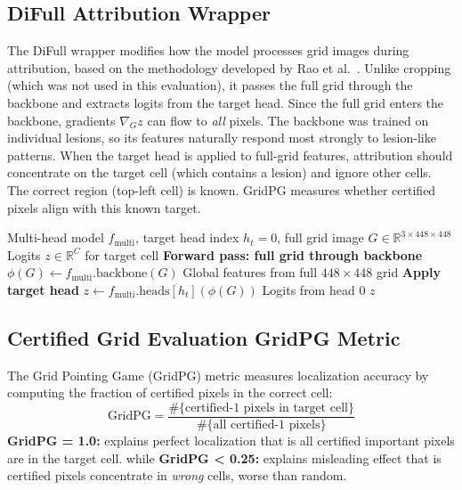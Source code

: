 \documentclass[11pt]{article}
\begin{document}
\subsection{DiFull Attribution Wrapper}

The DiFull wrapper modifies how the model processes grid images during attribution, based on the methodology developed by Rao et al.~\citep{rao2022understanding}. Unlike cropping (which was not used in this evaluation), it passes the full grid through the backbone and extracts logits from the target head. Since the full grid enters the backbone, gradients $\nabla_G z$ can flow to \emph{all} pixels. The backbone was trained on individual lesions, so its features naturally respond most strongly to lesion-like patterns. When the target head is applied to full-grid features, attribution should concentrate on the target cell (which contains a lesion) and ignore other cells.
The correct region (top-left cell) is known. GridPG measures whether certified pixels align with this known target.



\begin{algorithm}[H]
\caption{DiFull Attribution Wrapper}
\label{alg:difull_wrapper}
\begin{algorithmic}[1]
\REQUIRE Multi-head model $f_{\text{multi}}$, target head index $h_t=0$, full grid image $G \in \mathbb{R}^{3 \times 448 \times 448}$
\ENSURE Logits $z \in \mathbb{R}^C$ for target cell
\STATE \textbf{ Forward pass: full grid through backbone}
\STATE $\phi(G) \leftarrow f_{\text{multi}}.\text{backbone}(G)$ \quad  Global features from full $448 \times 448$ grid
\STATE \textbf{ Apply target head}
\STATE $z \leftarrow f_{\text{multi}}.\text{heads}[h_t](\phi(G))$ \quad  Logits from head 0
\RETURN $z$
\end{algorithmic}
\end{algorithm}


\subsection{Certified Grid Evaluation GridPG Metric}

The Grid Pointing Game (GridPG) metric \citep{rao2022understanding} measures localization accuracy by computing the fraction of certified pixels in the correct cell:
$$
\text{GridPG} = \frac{\#\{\text{certified-1 pixels in target cell}\}}{\#\{\text{all certified-1 pixels}\}}
$$
\textbf{GridPG = 1.0:} explains perfect localization that is all certified important pixels are in the target cell. while \textbf{GridPG < 0.25:} explains misleading effect that is certified pixels concentrate in \emph{wrong} cells, worse than random.
\end{document}
